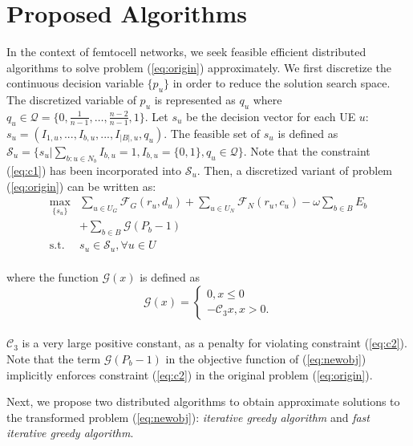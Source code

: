 \documentclass[conference]{IEEEtran}
\begin{document}
\section{Proposed Algorithms}
\label{algorithm}



In the context of femtocell networks, we seek feasible efficient distributed algorithms to solve problem (\ref{eq:origin}) approximately. We first discretize the continuous decision variable $\{p_u\}$ in order to reduce the solution search space. The discretized variable of $p_u$ is represented as $q_u$ where $q_u \in \mathcal{Q} = \{ 0, \frac{1}{n-1},\ldots, \frac{n-2}{n-1}, 1\}$. Let $s_u$ be the decision vector for each UE $u$: $s_u =(I_{1,u},...,I_{b,u},...,I_{|B|,u}, q_u )$. The feasible set of $s_u$ is defined as $\mathcal{S}_u = \{s_u|\sum_{b: u\in N_b}I_{b,u} = 1, I_{b,u} = \{ 0,1\}, q_u \in \mathcal{Q} \}$. Note that the constraint (\ref{eq:c1}) has been incorporated into $\mathcal{S}_u$. Then, a discretized variant of problem (\ref{eq:origin}) can be written as:
\begin{equation}
\begin{array}{ll}
\max\limits_{\{s_u\}} & \sum\limits_{u \in U_G} \mathcal{F}_G (r_u,d_u) + \sum\limits_{u \in U_N} \mathcal{F}_N (r_u,c_u) - \omega \sum\limits_{b \in B}E_b \\
& + \sum\limits_{b \in B}\mathcal{G}(P_b-1)\\
\mbox{s.t. } & s_u \in \mathcal{S}_u, \forall u\in U
\end{array}
\label{eq:newobj}
\end{equation}\\
where the function $\mathcal{G}(x)$ is defined as
\begin{equation}
\mathcal{G}(x) = 
\begin{cases}
0,x \leq 0 \\
-\mathcal{C}_3x, x > 0.
\end{cases}
\end{equation}\\
$\mathcal{C}_3$ is a very large positive constant, as a penalty for violating constraint (\ref{eq:c2}). Note that the term $\mathcal{G}(P_b - 1)$ in the objective function of (\ref{eq:newobj}) implicitly enforces constraint (\ref{eq:c2}) in the original problem (\ref{eq:origin}).









Next, we propose two distributed algorithms to obtain approximate solutions to the transformed problem (\ref{eq:newobj}): \textit{iterative greedy algorithm} and \textit{fast iterative greedy algorithm}.
\end{document}
